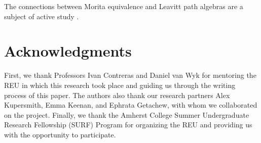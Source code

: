\documentclass[12pt]{amsart}
\theoremstyle{plain} \numberwithin{equation}{section}
\theoremstyle{definition}
\theoremstyle{definition}
\begin{document}
The connections between Morita equivalence and Leavitt path algebras are a subject of active study \cite{bock2024morita}\cite{clark2017subsets}\cite{kocc2022classification}.

\section{Acknowledgments} 

First, we thank Professors Ivan Contreras and Daniel van Wyk for mentoring the REU in which this research took place and guiding us through the writing process of this paper. The authors also thank our research partners Alex Kupersmith, Emma Keenan, and Ephrata Getachew, with whom we collaborated on the project. Finally, we thank the Amherst College Summer Undergraduate Research Fellowship (SURF) Program for organizing the REU and providing us with the opportunity to participate. 



\nocite{*}
\end{document}
